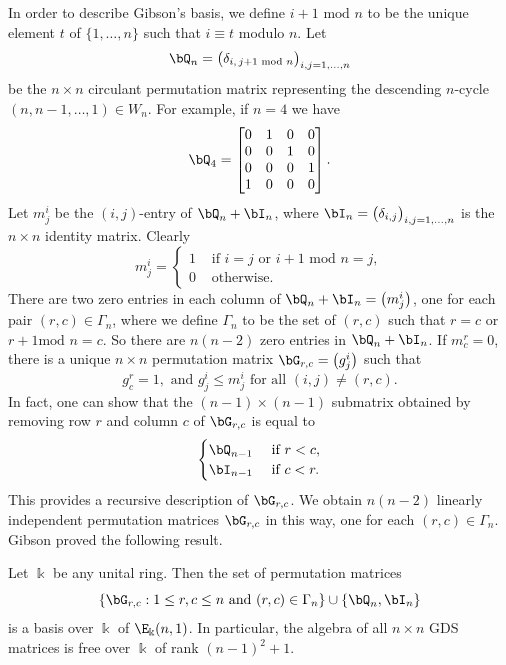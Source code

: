 In order to describe Gibson's basis, we define $i+1 \text{ mod } n$ to
be the unique element $t$ of $\{1, \dots, n\}$ such that $i \equiv t$
modulo $n$. Let
\[
\bQ_n = \big( \delta_{i,\, j+1 \text{ mod } n} \big)_{i,j = 1, \dots, n}
\]
be the $n \times n$ circulant permutation matrix representing the
descending $n$-cycle $(n, n-1, \dots, 1) \in W_n$. For example, if
$n=4$ we have
\[
\bQ_4 = 
\begin{bmatrix}
 0&1&0&0\\
 0&0&1&0\\
 0&0&0&1\\
 1&0&0&0
\end{bmatrix}.
\]
Let $m^i_j$ be the $(i,j)$-entry of $\bQ_n + \bI_n$, where $\bI_n =
\big( \delta_{i,j} \big)_{i,j = 1, \dots, n}$ is the $n \times n$
identity matrix. Clearly
\[ m^i_{j} = 
\begin{cases}
 1 & \text{ if } i=j \text{ or } i+1 \text{ mod } n = j,\\
 0 & \text{ otherwise.}
\end{cases}
\]
There are two zero entries in each column of $\bQ_n + \bI_n = \big(
m^i_{j} \big)$, one for each pair $(r,c) \in \Gamma_n$, where we define
$\Gamma_n$ to be the set of $(r,c)$ such that $r = c$ or $r+1 \text{
 mod } n = c$. So there are $n(n-2)$ zero entries in $\bQ_n +
\bI_n$. If $m^r_c = 0$, there is a unique $n \times n$ permutation
matrix $\bG_{r,c} = \big(g^i_j\big)$ such that
\[
g^r_c = 1, \text{ and } g^i_j \le m^i_j \text{ for all } (i,j) \ne (r,c).
\]
In fact, one can show that the $(n-1) \times (n-1)$ submatrix obtained
by removing row $r$ and column $c$ of $\bG_{r,c}$ is equal to
\[
 \begin{cases}
 \bQ_{n-1} & \text{ if } r<c,\\
 \bI_{n-1} & \text{ if } c<r.
 \end{cases}
\]
This provides a recursive description of $\bG_{r,c}$. We obtain
$n(n-2)$ linearly independent permutation matrices $\bG_{r,c}$ in this
way, one for each $(r,c) \in \Gamma_n$. Gibson proved the following
result.


\begin{theo}
Let $\Bbbk$ be any unital ring. Then the set of permutation matrices 
\[
 \{ \bG_{r,c}: 1 \le r,c \le n \text{ and } (r,c) \in \Gamma_n \}
 \cup \{ \bQ_n, \bI_n \}
\]
is a basis over $\Bbbk$ of $\E_\Bbbk(n,1)$. In particular, the algebra
of all $n \times n$ GDS matrices is free over $\Bbbk$ of rank $(n-1)^2
+ 1$.
\end{theo}

